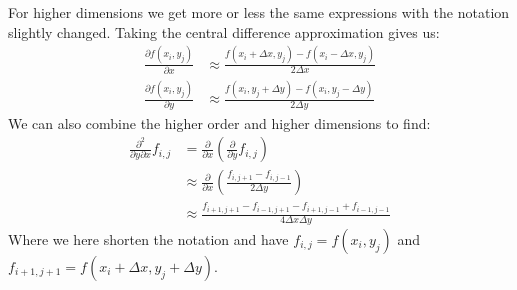 For higher dimensions we get more or less the same expressions with the notation slightly changed. Taking the central difference approximation gives us:
\begin{align*}
	\frac{\partial f(x_i,y_j)}{\partial x} &\approx \frac{f(x_i+\Delta x,y_j) - f(x_i-\Delta x,y_j)}{2\Delta x}\\
	\frac{\partial f(x_i,y_j)}{\partial y} &\approx \frac{f(x_i,y_j +\Delta y) - f(x_i,y_j -\Delta y)}{2\Delta y}
\end{align*}
We can also combine the higher order and higher dimensions to find:
\begin{align*}
	\frac{\partial^2}{\partial y \partial x} f_{i,j} &= \frac{\partial}{\partial x}\left(\frac{\partial}{\partial y}f_{i,j}\right)\\
	&\approx \frac{\partial}{\partial x}\left( \frac{f_{i,j +1} - f_{i,j -1}}{2\Delta y} \right)\\
	&\approx \frac{f_{i+1,j+1} - f_{i-1,j+1} - f_{i+1,j-1} + f_{i-1,j-1}}{4\Delta x \Delta y}
\end{align*}
Where we here shorten the notation and have $f_{i,j} = f(x_i,y_j)$ and $f_{i+1,j+1} = f(x_i + \Delta x,y_j + \Delta y)$.